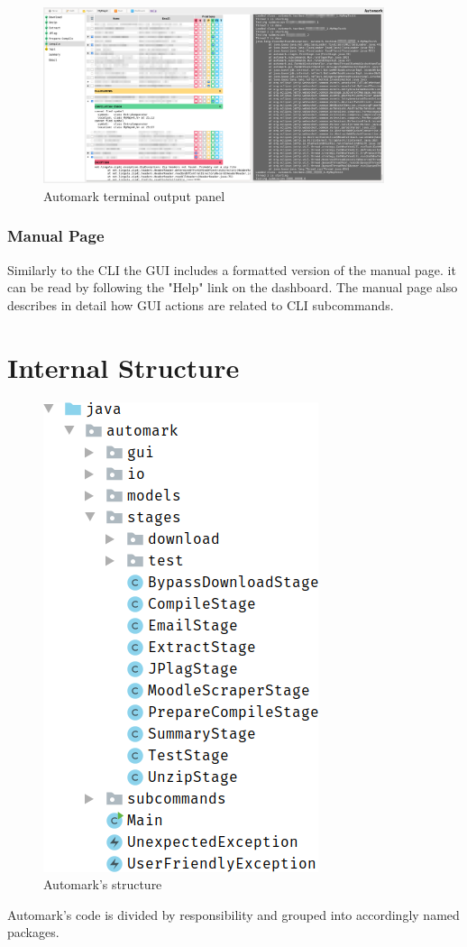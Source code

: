 \documentclass[12pt,a4paper,oneside]{report}
\begin{document}
	\begin{figure}[H]
		\centering
		\includegraphics[width=10cm,trim=56cm 20cm 0 2cm,clip]{automark_dashboard_w_details_expanded.png}
		\caption{Automark terminal output panel}
	\end{figure}

	\subsubsection{Manual Page}
	Similarly to the CLI the GUI includes a formatted version of the manual page. it can be read by following the "Help" link on the dashboard. The manual page also describes in detail how GUI actions are related to CLI subcommands.

	\section{Internal Structure}

	\begin{figure}
		\vskip-20pt
		\includegraphics[width=.29\textwidth]{automark_code_structure.png}
		\caption{Automark's structure}
	\end{figure}

	Automark's code is divided by responsibility and grouped into accordingly named packages.
\end{document}
